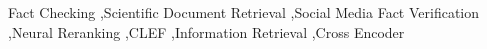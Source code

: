 \documentclass{ceurart}
\begin{document}
  \begin{keywords}
    Fact Checking \sep Scientific Document Retrieval \sep Social Media Fact Verification \sep Neural Reranking \sep CLEF \sep Information Retrieval \sep Cross Encoder

  \end{keywords}

  \maketitle


  

  

  

  

  

  

  

  
\end{document}
